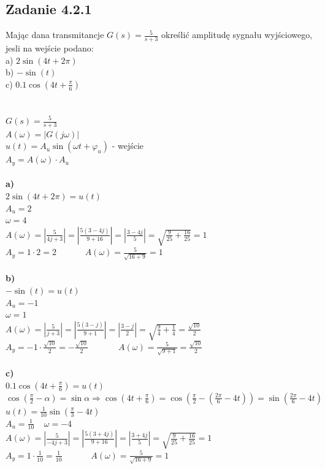 \subsection*{Zadanie 4.2.1} {\color{darkgray}
	Mając dana transmitancje $G(s)=\frac{5}{s+3}$ określić amplitudę sygnału wyjściowego, jesli na wejście podano:\\
	a) $2\sin(4t+2 \pi)$\\
	b) $-\sin(t)$\\
	c) $0.1\cos(4t+\frac\pi 6)$\\
}\lineh
\\\\
$G(s)=\frac{5}{s+3}$\\
$A(\omega)=|G(j\omega)|$\\
$u(t)=A_u\sin(\omega t+\varphi_u )$ - wejście\\
$A_y=A(\omega) \cdot A_u$\\
\\
\textbf{a)}\\
$2\sin(4t+2\pi)=u(t)$\\
$A_u=2$\\
$\omega=4$\\
$A(\omega)=|\frac{5}{4j+3}|=|\frac{5(3-4j)}{9+16}|=|\frac{3-4j}{5}|=\sqrt{\frac{9}{25}+\frac{16}{25}}=1$\\
$A_y=1 \cdot 2 = \boxed{2}$ \ \ \ \ \ \   {\color{lightgray}$A(\omega)=\frac{5}{\sqrt{16+9}}=1$}\\
\\
\textbf{b)}\\
$-\sin(t)=u(t)$\\
$A_u=-1$\\
$\omega=1$\\
$A(\omega)=|\frac{5}{j+3}|=|\frac{5(3-j)}{9+1}|=|\frac{3-j}{2}|=\sqrt{\frac 94+\frac 14}=\frac{\sqrt{10}}{2}$\\
$A_y=-1 \cdot \frac{\sqrt{10}}{2}=\boxed{-\frac{\sqrt{10}}{2}}$\ \ \ \ \ \ \   {\color{lightgray}$A(\omega)=\frac{5}{\sqrt{9+1}}=\frac{\sqrt{10}}{2}$}\\
\\
\textbf{c)}\\
$0.1\cos(4t+\frac\pi 6)=u(t)$\\
$\cos(\frac\pi 2 - \alpha)=\sin \alpha \Rightarrow \cos(4t+\frac \pi 6 ) = \cos (\frac \pi 2 -(\frac{2\pi}{6} - 4t))= \sin(\frac{2\pi}{6}-4t)$\\
$u(t)=\frac{1}{10}\sin(\frac \pi 3 - 4t)$\\
$A_u = \frac{1}{10} \ \ \ \ \ \omega=-4$\\
$A(\omega)=|\frac{5}{-4j+3}|=|\frac{5(3+4j)}{9+16}|=|\frac{3+4j}{5}|=\sqrt{\frac{9}{25}+\frac{16}{25}}=1$\\
$A_y=1 \cdot \frac{1}{10} = \boxed{\frac{1}{10}}$ \ \ \ \ \ \   {\color{lightgray}$A(\omega)=\frac{5}{\sqrt{16+9}}=1$}\\

